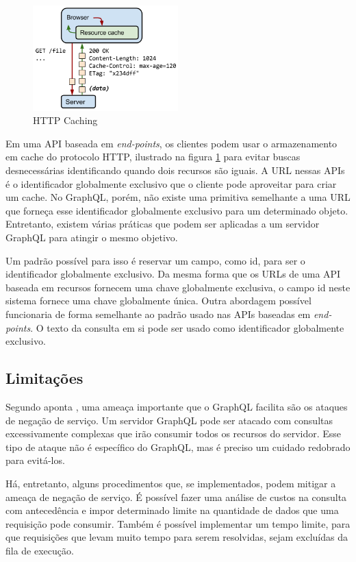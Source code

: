 \begin{figure}[htbp]
\centering
\includegraphics[width=0.5\textwidth]{figuras/cache-http.png}
\caption{HTTP Caching}
\label{fig:cache-http}
\end{figure}

Em uma API baseada em \textit{end-points}, os clientes podem usar o armazenamento em cache do protocolo HTTP, ilustrado na figura \ref{fig:cache-http} para evitar buscas desnecessárias identificando quando dois recursos são iguais. A URL nessas APIs é o identificador globalmente exclusivo que o cliente pode aproveitar para criar um cache. No GraphQL, porém, não existe uma primitiva semelhante a uma URL que forneça esse identificador globalmente exclusivo para um determinado objeto. Entretanto, existem várias práticas que podem ser aplicadas a um servidor GraphQL para atingir o mesmo objetivo.

Um padrão possível para isso é reservar um campo, como \textup{id}, para ser o identificador globalmente exclusivo. Da mesma forma que os URLs de uma API baseada em recursos fornecem uma chave globalmente exclusiva, o campo \textup{id} neste sistema fornece uma chave globalmente única. Outra abordagem possível funcionaria de forma semelhante ao padrão usado nas APIs baseadas em \textit{end-points}. O texto da consulta em si pode ser usado como identificador globalmente exclusivo. 

\subsection{Limitações}

Segundo aponta , uma ameaça importante que o GraphQL facilita são os ataques de negação de serviço. Um servidor GraphQL pode ser atacado com consultas excessivamente complexas que irão consumir todos os recursos do servidor. Esse tipo de ataque não é específico do GraphQL, mas é preciso um cuidado redobrado para evitá-los.

Há, entretanto, alguns procedimentos que, se implementados, podem mitigar a ameaça de negação de serviço. É possível fazer uma análise de custos na consulta com antecedência e impor determinado limite na quantidade de dados que uma requisição pode consumir. Também é possível implementar um tempo limite, para que requisições que levam muito tempo para serem resolvidas, sejam excluídas da fila de execução.